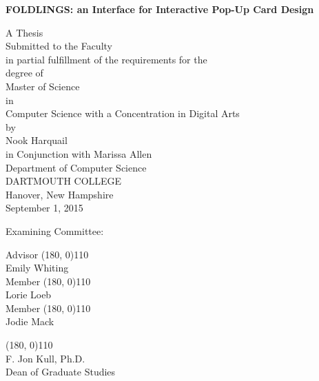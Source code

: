 \pagestyle{plain}
\begin{center}
\textbf{FOLDLINGS: an Interface for Interactive Pop-Up Card Design}
\vspace{0.4cm}

A Thesis\\ [0.4cm]
Submitted to the Faculty \\ [0.4cm]
in partial fulfillment of the requirements for the \\[0.4cm]
degree of \\[0.4cm]
Master of Science\\in\\Computer Science with a Concentration in Digital Arts\\[0.4cm]
by\\[0.5cm]
Nook Harquail\\[0.4cm]
in Conjunction with Marissa Allen \\[0.5cm]
Department of Computer Science \\ [0.4cm]
DARTMOUTH COLLEGE \\ [0.4cm]
Hanover, New Hampshire \\[0.4cm]
September 1, 2015 %
\vspace{1.5cm}

\end{center}

Examining Committee:

\begin{flushright}
Advisor \line(180, 0){110} \\
Emily Whiting \\[1cm]

Member \line(180, 0){110} \\
Lorie Loeb \\[1cm]

Member \line(180, 0){110} \\
Jodie Mack \\[1cm]



\end{flushright}

\begin{flushleft}
\line(180, 0){110} \\
F. Jon Kull, Ph.D.\\
Dean of Graduate Studies\\[1cm]
\end{flushleft}
